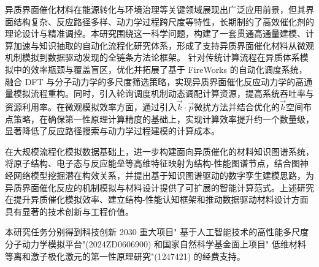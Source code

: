 
异质界面催化材料在能源转化与环境治理等关键领域展现出广泛应用前景，但其界面结构复杂、反应路径多样、动力学过程跨尺度等特性，长期制约了高效催化剂的理论设计与精准调控。本研究围绕这一科学问题，构建了一套贯通高通量建模、计算加速与知识抽取的自动化流程化研究体系，形成了支持异质界面催化材料从微观机制模拟到数据驱动发现的全链条方法论框架。
针对传统计算流程在异质体系模拟中的效率瓶颈与覆盖盲区，优化并拓展了基于 FireWorks 的自动化调度系统，融合 DFT 与分子动力学的多尺度筛选策略，实现异质界面催化反应动力学的高通量模拟流程重构。同时，引入轮询调度机制动态调配计算资源，提高系统吞吐率与资源利用率。在微观模拟效率方面，通过引入$\vec k\cdot\vec p$微扰方法并结合优化的$\vec k$空间布点策略，在确保第一性原理计算精度的基础上，实现计算效率提升约一个数量级，显著降低了反应路径搜索与动力学过程建模的计算成本。

在大规模流程化模拟数据基础上，进一步构建面向异质催化的材料知识图谱系统，将原子结构、电子态与反应能垒等高维特征映射为结构-性能图谱节点，结合图神经网络模型挖掘潜在构效关系，并提出基于知识图谱驱动的数字孪生建模思路，为异质界面催化反应的机制模拟与材料设计提供了可扩展的智能计算范式。上述研究在提升异质催化模拟效率、建立结构-性能认知框架和推动数据驱动材料设计方面具有显著的技术创新与工程价值。

本研究任务分别得到科技创新 2030 重大项目" 基于人工智能技术的高性能多尺度分子动力学模拟平台"(2024ZD0606900)%
和国家自然科学基金面上项目" 低维材料等离和激子极化激元的第一性原理研究"(1247421) 的经费支持。

